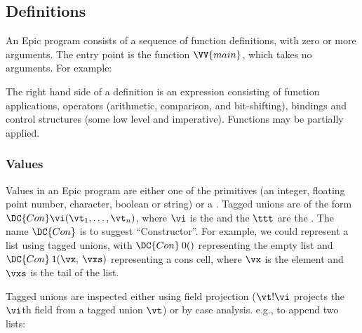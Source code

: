 \subsection{Definitions}

An Epic program consists of a sequence of  function
definitions, with zero or more arguments. The entry point is the
function $\VV{main}$, which takes no arguments. For example:


\noindent
The right hand side of a definition is an expression consisting of
function applications, operators (arithmetic, comparison, and
bit-shifting), bindings and control structures (some low level and
imperative).  Functions may be partially applied.

\subsubsection*{Values}

Values in an Epic program are either one of the primitives (an
integer, floating point number, character, boolean or string) or a
. Tagged unions are of the form $\DC{Con}
\vi(\vt_1,\ldots,\vt_n)$, where $\vi$ is the  and the $\ttt$
are the . The name $\DC{Con}$ is to suggest
``Constructor''. For example, we could represent a list using tagged
unions, with $\DC{Con}\:0()$ representing the empty list and
$\DC{Con}\:1(\vx,\:\vxs)$ representing a cons cell, where $\vx$
is the element and $\vxs$ is the tail of the list.

Tagged unions are inspected either using field projection ($\vt!\vi$
projects the $\vi$th field from a tagged union $\vt$) or by case
analysis. e.g., to append two lists:


